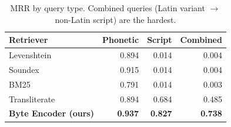 \begin{table}
\caption{MRR by query type. Combined queries (Latin variant $\rightarrow$ non-Latin script) are the hardest.}
\label{tab:by_type}
\begin{tabular}{lrrr}
\toprule
Retriever & Phonetic & Script & Combined \\
\midrule
Levenshtein & 0.894 & 0.014 & 0.004 \\
Soundex & 0.915 & 0.014 & 0.004 \\
BM25 & 0.791 & 0.014 & 0.003 \\
Transliterate & 0.894 & 0.684 & 0.485 \\
\textbf{Byte Encoder (ours)} & \textbf{0.937} & \textbf{0.827} & \textbf{0.738} \\
\bottomrule
\end{tabular}
\end{table}
